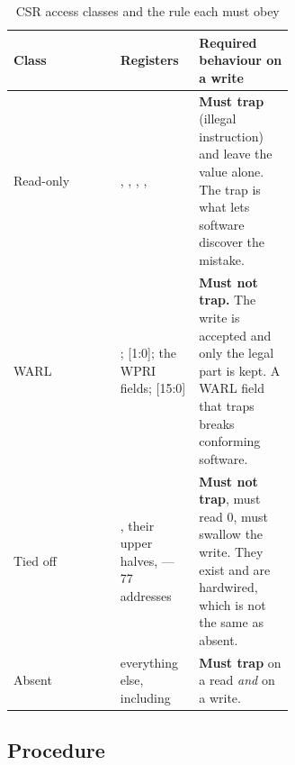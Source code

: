 \begin{table}[H]
\centering
\caption{CSR access classes and the rule each must obey}
\label{tab:csrclass}
\begin{tabular}{@{}lL{0.28\linewidth}L{0.34\linewidth}@{}}
\toprule
\textbf{Class} & \textbf{Registers} & \textbf{Required behaviour on a write} \\
\midrule
Read-only & , , , ,
   & \textbf{Must trap} (illegal instruction) and leave the value
  alone. The trap is what lets software discover the mistake. \\
WARL & ; [1:0]; the  WPRI fields;
  [15:0] & \textbf{Must not trap.} The write is accepted and only the
  legal part is kept. A WARL field that traps breaks conforming software. \\
Tied off & , their upper halves,  ---
  77 addresses & \textbf{Must not trap}, must read 0, must swallow the write.
  They exist and are hardwired, which is not the same as absent. \\
Absent & everything else, including  & \textbf{Must trap} on
  a read \emph{and} on a write. \\
\bottomrule
\end{tabular}
\end{table}

\subsection*{Procedure}


